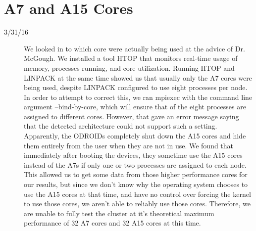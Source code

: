  \section{A7 and A15 Cores}
 \begin{description}
 \item [3/31/16] We looked in to which core were actually being used at the advice of Dr. McGough. We installed a tool HTOP that monitors real-time usage of memory, processes running, and core utilization. Running HTOP and LINPACK at the same time showed us that usually only the A7 cores were being used, despite LINPACK configured to use eight processes per node. In order to attempt to correct this, we ran mpiexec with the command line argument --bind-by-core, which will ensure that of the eight processes are assigned to different cores. However, that gave an error message saying that the detected architecture could not support such a setting. Apparently, the ODROIDs completely shut down the A15 cores and hide them entirely from the user when they are not in use. We found that immediately after booting the devices, they sometime use the A15 cores instead of the A7s if only one or two processes are assigned to each node. This allowed us to get some data from those higher performance cores for our results, but since we don't know why the operating system chooses to use the A15 cores at that time, and have no control over forcing the kernel to use those cores, we aren't able to reliably use those cores. Therefore, we are unable to fully test the cluster at it's theoretical maximum performance of 32 A7 cores and 32 A15 cores at this time.
 \end{description} 
